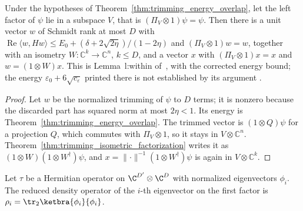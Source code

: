 \begin{theorem}
    \label{thm:trimmed_witness}
    \leanok
    Under the hypotheses of Theorem~\ref{thm:trimming_energy_overlap}, let the
    left factor of $\psi$ lie in a subspace $V$, that is
    $(\Pi_V\otimes1)\psi=\psi$. Then there is a unit vector $w$ of Schmidt rank
    at most $D$ with
    $\operatorname{Re}\langle w,Hw\rangle\le E_0+(\delta+2\sqrt{2\eta})/(1-2\eta)$
    and $(\Pi_V\otimes1)w=w$, together with an isometry
    $W:\mathbb C^k\to\mathbb C^n$, $k\le D$, and a vector $x$ with
    $(\Pi_V\otimes1)x=x$ and $w=(1\otimes W)x$. This is
    Lemma~l:within of~\cite[lines 509--515]{Landau2013PolynomialTime}, with
    the corrected energy bound; the energy $\varepsilon_0+6\sqrt{c_\varepsilon}$
    printed there is not established by its argument
    \cite{gap:lvv13_trimming_energy}.
\end{theorem}

\begin{proof}
    \leanok
    Let $w$ be the normalized trimming of $\psi$ to $D$ terms; it is nonzero
    because the discarded part has squared norm at most $2\eta<1$. Its energy is
    Theorem~\ref{thm:trimming_energy_overlap}. The trimmed vector is
    $(1\otimes Q)\psi$ for a projection $Q$, which commutes with
    $\Pi_V\otimes1$, so it stays in $V\otimes\mathbb C^n$.
    Theorem~\ref{thm:trimming_isometric_factorization} writes it as
    $(1\otimes W)(1\otimes W^\dagger)\psi$, and
    $x=\lVert\cdot\rVert^{-1}(1\otimes W^\dagger)\psi$ is again in
    $V\otimes\mathbb C^k$.
\end{proof}

\begin{definition}
    \label{def:reduced_eig_density}
    \leanok
    Let $\tau$ be a Hermitian operator on
    $\C^{D'}\otimes\C^{D}$ with normalized eigenvectors $\phi_i$. The reduced
    density operator of the $i$-th eigenvector on the first factor is
    $\rho_i=\tr_2\ketbra{\phi_i}{\phi_i}$.
\end{definition}

